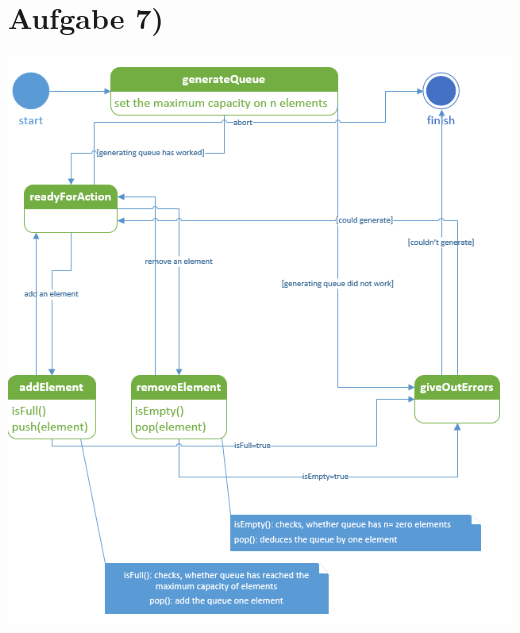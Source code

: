\documentclass{swp1}
\begin{document}
\section*{Aufgabe 7)}

\includegraphics{queue_paint}
\end{document}
